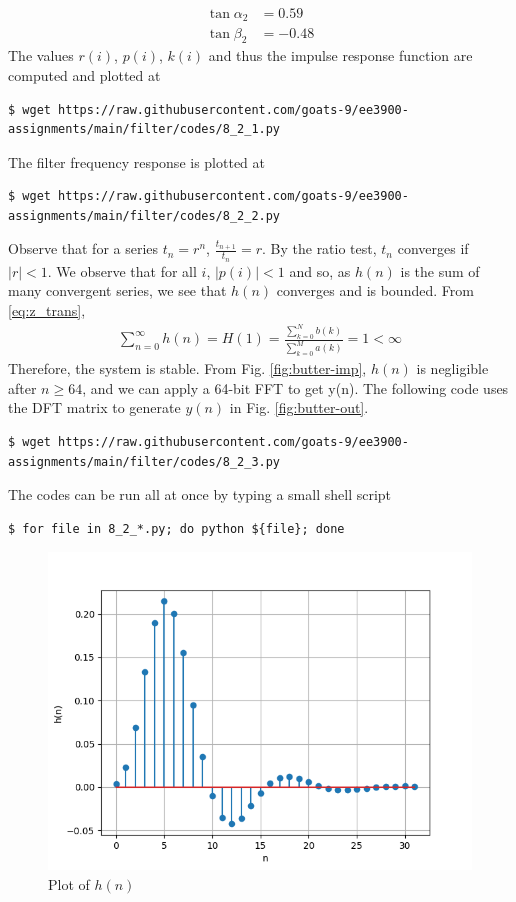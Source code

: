 \documentclass[journal,12pt,twocolumn]{IEEEtran}
\renewcommand\thesection{\arabic{section}}
\begin{document}
\begin{enumerate}[label=\thesection.\arabic*.,ref=\thesection.\theenumi]
\begin{align}
	\tan{\alpha_2} &= 0.59 \\
	\tan{\beta_2} &= -0.48
	\label{eq:h-params}
\end{align}
The values $r(i)$, $p(i)$, $k(i)$ and thus the impulse response function are computed and plotted at
\begin{lstlisting}
$ wget https://raw.githubusercontent.com/goats-9/ee3900-assignments/main/filter/codes/8_2_1.py
\end{lstlisting}
The filter frequency response is plotted at
\begin{lstlisting}
$ wget https://raw.githubusercontent.com/goats-9/ee3900-assignments/main/filter/codes/8_2_2.py
\end{lstlisting}
Observe that for a series $t_n = r^n$, $\frac{t_{n + 1}}{t_n} = r$.
By the ratio test, $t_n$ converges if $|r| < 1$. We observe that for all $i$, 
$|p(i)| < 1$ and so, as $h(n)$ is the sum of many convergent series,
we see that $h(n)$ converges and is bounded. From \eqref{eq:z_trans},
\begin{align}
	\sum_{n = 0}^{\infty}h(n) = H(1) = \frac{\sum_{k = 0}^{N}b(k)}{\sum_{k = 0}^{M}a(k)} = 1 < \infty
\end{align}
Therefore, the system is stable. From
Fig. \eqref{fig:butter-imp}, $h(n)$ is negligible after $n \geq 64$, and we
can apply a 64-bit FFT to get y(n). The following code uses the DFT matrix
to generate $y(n)$ in Fig. \eqref{fig:butter-out}.
\begin{lstlisting}
$ wget https://raw.githubusercontent.com/goats-9/ee3900-assignments/main/filter/codes/8_2_3.py
\end{lstlisting}
The codes can be run all at once by typing a small shell script
\begin{lstlisting}
$ for file in 8_2_*.py; do python ${file}; done
\end{lstlisting}

\begin{figure}[!htb]
	\includegraphics[width=\columnwidth]{Figures/Q8/8__2__1.png}
	\caption{Plot of $h(n)$}
	\label{fig:butter-imp}
\end{figure}


\end{enumerate}
\end{document}
